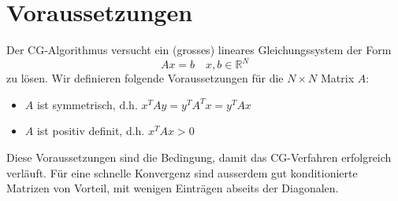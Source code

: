 \section{Voraussetzungen\label{cg:section:voraussetzungen}}

Der CG-Algorithmus versucht ein (grosses) lineares Gleichungssystem der Form
\begin{equation}
Ax = b \quad x, b \in \mathbb{R}^N
\end{equation}
zu lösen.
Wir definieren folgende Voraussetzungen für die $N\times N$ Matrix $A$:
\begin{itemize}
	\item $A$ ist symmetrisch, d.h. $x^T A y = y^T A^T x = y^T A x$
	\item $A$ ist positiv definit, d.h. $x^T A x > 0$
\end{itemize}
Diese Voraussetzungen sind die Bedingung, damit das CG-Verfahren erfolgreich verläuft.
Für eine schnelle Konvergenz sind ausserdem gut konditionierte Matrizen von Vorteil, mit wenigen Einträgen abseits der Diagonalen.